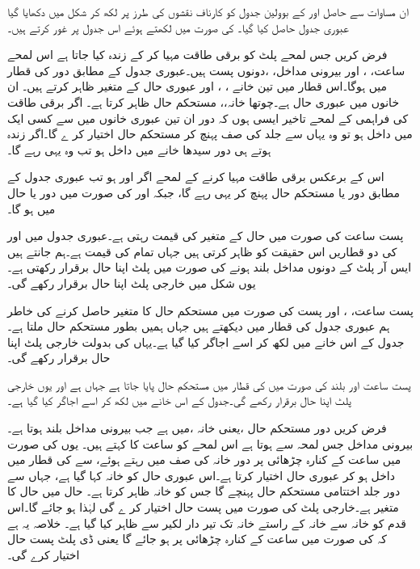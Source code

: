  ان مساوات سے حاصل   اور  کے بوولین جدول  کو کارناف نقشوں  کی طرز پر لکھ کر  شکل میں دکھایا گیا عبوری جدول حاصل کیا گیا۔   کی  صورت میں لکھتے ہوئے اس جدول پر غور کرتے ہیں۔


فرض کریں جس لمحے   پلٹ کو برقی طاقت مہیا  کر کے زندہ کیا جاتا ہے  اس لمحے ساعت، ، اور بیرونی مداخل،  ،دونوں پست ہیں۔عبوری جدول کے مطابق دور  کی قطار میں ہوگا۔اس قطار میں تین خانے  ، ، اور  عبوری حال کے متغیر ظاہر کرتے ہیں۔ ان  خانوں میں عبوری حال   ہے۔چوتھا خانہ،، مستحکم حال    ظاہر کرتا ہے۔   اگر برقی طاقت کی فراہمی  کے لمحے تاخیر  ایسی ہوں کہ دور ان تین عبوری خانوں میں سے  کسی ایک میں داخل ہو تو  وہ یہاں سے جلد   کی صف پہنچ کر مستحکم حال اختیار کر ے  گا۔اگر زندہ ہوتے ہی دور سیدھا  خانے میں داخل ہو تب  وہ  یہی رہے گا۔

اس کے برعکس برقی طاقت مہیا کرنے کے لمحے اگر  اور  ہو تب عبوری جدول کے مطابق دور  یا  مستحکم حال  پہنچ کر یہی رہے گا،  جبکہ   اور  کی صورت میں دور   یا    حال میں ہو گا۔

پست ساعت کی صورت میں حال کے متغیر  کی قیمت   رہتی ہے۔عبوری جدول میں  اور  کی دو قطاریں اس   حقیقت  کو ظاہر کرتی ہیں جہاں تمام   کی قیمت    ہے۔ہم جانتے ہیں ایس  آر پلٹ کے دونوں مداخل بلند ہونے کی صورت میں پلٹ اپنا حال برقرار رکھتی  ہے۔یوں شکل   میں خارجی پلٹ اپنا حال برقرار رکھے گی۔

پست ساعت، ، اور پست   کی صورت میں مستحکم حال کا متغیر   حاصل کرنے کی خاطر ہم عبوری جدول کی   قطار میں دیکھتے ہیں جہاں ہمیں   بطور مستحکم حال ملتا ہے۔جدول  کے اس خانے میں   لکھ کر اسے اجاگر کیا گیا ہے۔یہاں  کی بدولت  خارجی پلٹ اپنا حال برقرار رکھے گی۔

پست ساعت اور بلند  کی صورت میں    کی قطار میں مستحکم حال   پایا جاتا ہے جہاں   ہے اور یوں خارجی پلٹ اپنا حال برقرار رکھے گی۔جدول کے اس خانے میں   لکھ کر اسے  اجاگر  کیا گیا ہے۔

فرض  کریں دور مستحکم حال ،یعنی خانہ  ،میں   ہے جب  بیرونی مداخل   بلند ہوتا ہے۔بیرونی مداخل   جس لمحہ   سے  ہوتا ہے اس لمحے کو ساعت کا  کہتے ہیں۔ یوں   کی صورت میں ساعت کے کنارہ چڑھائی پر دور خانہ   کی صف میں رہتے ہوئے،  سے  کی قطار میں داخل ہو کر عبوری  حال    اختیار کرتا ہے۔اس عبوری حال کو خانہ   کہا گیا ہے، جہاں سے دور جلد اختتامی مستحکم حال    پہنچے گا جس  کو  خانہ   ظاہر کرتا ہے۔ حال   میں حال کا متغیر    ہے۔خارجی پلٹ   کی صورت میں پست حال اختیار کر ے گی  لہٰذا  ہو جائے گا۔اس قدم کو  خانہ  سے  خانہ   کے راستے خانہ   تک تیر دار  لکیر سے  ظاہر کیا گیا ہے۔  خلاصہ   یہ ہے کہ   کی صورت میں ساعت کے کنارہ چڑھائی پر   ہو جائے گا یعنی ڈی پلٹ پست حال اختیار کرے گی۔

